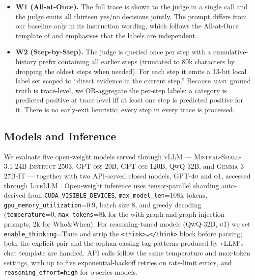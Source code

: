 \begin{itemize}\itemsep2pt
\item \textbf{W1 (All-at-Once).} The full trace is shown to the judge in a
single call and the judge emits all thirteen yes/no decisions jointly. The
prompt differs from our baseline only in its instruction wording, which
follows the All-at-Once template of \citet{yin2025whoandwhen} and
emphasises that the labels are independent.
\item \textbf{W2 (Step-by-Step).} The judge is queried once per step with
a cumulative-history prefix containing all earlier steps (truncated to
$80$k characters by dropping the oldest steps when needed). For each
step it emits a 13-bit local label set scoped to ``direct evidence in the
current step.'' Because \textsc{mast} ground truth is trace-level, we
OR-aggregate the per-step labels: a category is predicted positive at
trace level iff at least one step is predicted positive for it. There is
no early-exit heuristic; every step in every trace is processed.
\end{itemize}

\subsection{Models and Inference}
\label{ssec:models}

We evaluate five open-weight models served through
\textsc{vLLM} \citep{kwon2023vllm} ---
\textsc{Mistral-Small-3.1-24B-Instruct-2503},
\textsc{GPT-oss-20B}, \textsc{GPT-oss-120B},
\textsc{QwQ-32B}, and \textsc{Gemma-3-27B-IT} ---
together with two API-served closed models, \textsc{GPT-4o} and
\textsc{o1}, accessed through \textsc{LiteLLM} \citep{berriai2024litellm}.
Open-weight inference uses tensor-parallel sharding auto-derived from
\texttt{CUDA\_VISIBLE\_DEVICES}, \texttt{max\_model\_len}=108k tokens,
\texttt{gpu\_memory\_utilization}=0.9, batch size $8$, and greedy decoding
(\texttt{temperature}=0, \texttt{max\_tokens}=8k for the with-graph and
graph-injection prompts, $2$k for Who\&When). For reasoning-tuned models
(\textsc{QwQ-32B}, \textsc{o1}) we set \texttt{enable\_thinking}=\textsc{True}
and strip the \texttt{<think>\ldots</think>} block before parsing; both
the explicit-pair and the orphan-closing-tag patterns produced by vLLM's
chat template are handled. API calls follow the same temperature and
max-token settings, with up to five exponential-backoff retries on
rate-limit errors, and \texttt{reasoning\_effort=high} for o-series
models.

